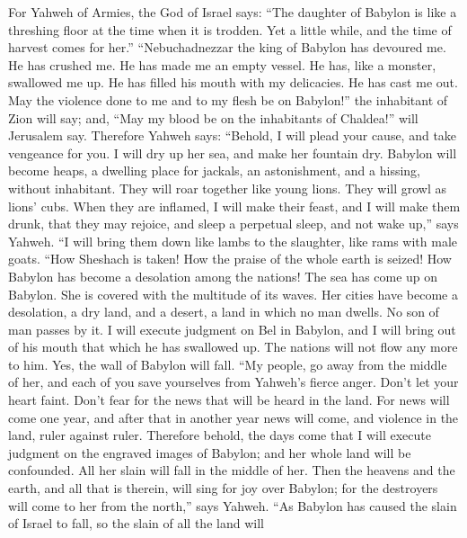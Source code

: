  For Yahweh of Armies, the God of Israel says: ``The
daughter of Babylon is like a threshing floor at the time when it is
trodden. Yet a little while, and the time of harvest comes for her.''
 ``Nebuchadnezzar the king of Babylon has devoured me. He
has crushed me. He has made me an empty vessel. He has, like a monster,
swallowed me up. He has filled his mouth with my delicacies. He has cast
me out.  May the violence done to me and to my flesh be
on Babylon!'' the inhabitant of Zion will say; and, ``May my blood be on
the inhabitants of Chaldea!'' will Jerusalem say. 
Therefore Yahweh says: ``Behold, I will plead your cause, and take
vengeance for you. I will dry up her sea, and make her fountain dry.
 Babylon will become heaps, a dwelling place for jackals,
an astonishment, and a hissing, without inhabitant.  They
will roar together like young lions. They will growl as lions' cubs.
 When they are inflamed, I will make their feast, and I
will make them drunk, that they may rejoice, and sleep a perpetual
sleep, and not wake up,'' says Yahweh.  ``I will bring
them down like lambs to the slaughter, like rams with male goats.
 ``How Sheshach is taken! How the praise of the whole
earth is seized! How Babylon has become a desolation among the nations!
 The sea has come up on Babylon. She is covered with the
multitude of its waves.  Her cities have become a
desolation, a dry land, and a desert, a land in which no man dwells. No
son of man passes by it.  I will execute judgment on Bel
in Babylon, and I will bring out of his mouth that which he has
swallowed up. The nations will not flow any more to him. Yes, the wall
of Babylon will fall.  ``My people, go away from the
middle of her, and each of you save yourselves from Yahweh's fierce
anger.  Don't let your heart faint. Don't fear for the
news that will be heard in the land. For news will come one year, and
after that in another year news will come, and violence in the land,
ruler against ruler.  Therefore behold, the days come
that I will execute judgment on the engraved images of Babylon; and her
whole land will be confounded. All her slain will fall in the middle of
her.  Then the heavens and the earth, and all that is
therein, will sing for joy over Babylon; for the destroyers will come to
her from the north,'' says Yahweh.  ``As Babylon has
caused the slain of Israel to fall, so the slain of all the land will
